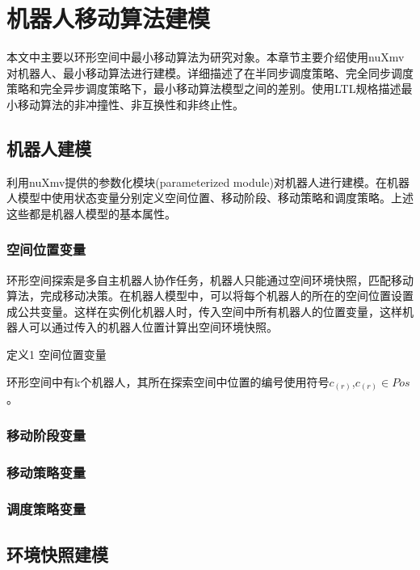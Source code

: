 ﻿\chapter{机器人移动算法建模}
本文中主要以环形空间中最小移动算法为研究对象。本章节主要介绍使用nuXmv对机器人、最小移动算法进行建模。详细描述了在半同步调度策略、完全同步调度策略和完全异步调度策略下，最小移动算法模型之间的差别。使用LTL规格描述最小移动算法的非冲撞性、非互换性和非终止性。

\section{机器人建模} 
利用nuXmv提供的参数化模块(parameterized module)对机器人进行建模。在机器人模型中使用状态变量分别定义空间位置、移动阶段、移动策略和调度策略。上述这些都是机器人模型的基本属性。

\subsection{空间位置变量}
环形空间探索是多自主机器人协作任务，机器人只能通过空间环境快照，匹配移动算法，完成移动决策。在机器人模型中，可以将每个机器人的所在的空间位置设置成公共变量。这样在实例化机器人时，传入空间中所有机器人的位置变量，这样机器人可以通过传入的机器人位置计算出空间环境快照。

\vspace{0.5cm}

\begin{bfseries} 定义1 \quad 空间位置变量 \quad \end{bfseries} 环形空间中有k个机器人，其所在探索空间中位置的编号使用符号$c_{\left(r\right)}$,$c_{\left(r\right)} \in Pos$。

\vspace{0.5cm}


\subsection{移动阶段变量}


\subsection{移动策略变量}


\subsection{调度策略变量}


\section{环境快照建模}

